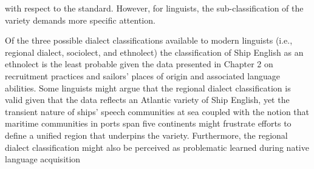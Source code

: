 \begin{styleStandard}
with respect to the standard. However, for linguists, the sub-classification of the variety demands more specific attention. 
\end{styleStandard}

\begin{styleStandard}
Of the three possible dialect classifications available to modern linguists (i.e., regional dialect, sociolect, and ethnolect) the classification of Ship English as an ethnolect is the least probable given the data presented in Chapter 2 on recruitment practices and sailors’ places of origin and associated language abilities. Some linguists might argue that the regional dialect classification is valid given that the data reflects an Atlantic variety of Ship English, yet the transient nature of ships’ speech communities at sea coupled with the notion that maritime communities in ports span five continents might frustrate efforts to define a unified region that underpins the variety. Furthermore, the regional dialect classification might also be perceived as problematic\textbf{ }learned during native language acquisition
\end{styleStandard}

